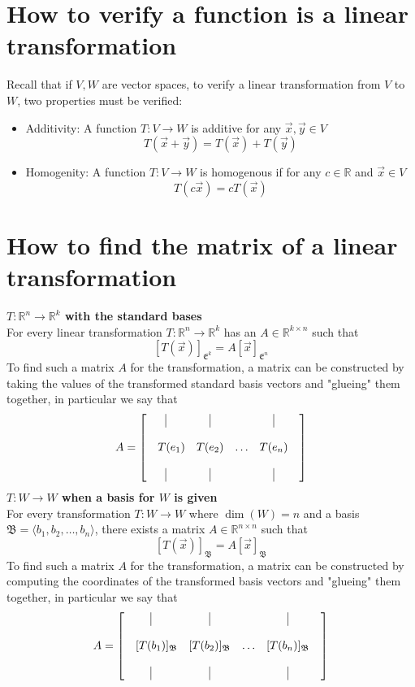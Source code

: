 \documentclass{report}
\begin{document}
\section{How to verify a function is a linear transformation}
Recall that if $V,W$ are vector spaces, to verify a linear transformation from $V$ to $W$, two properties must be verified:
\begin{itemize}
\item Additivity: A function $T:V\rightarrow W$ is additive for any $\vec{x},\vec{y}\in V$
$$
T(\vec{x}+\vec{y}) = T(\vec{x}) + T(\vec{y})
$$
\item Homogenity: A function $T:V \rightarrow W$ is homogenous if for any $c\in\mathbb{R}$ and $\vec{x}\in V$
$$
T(c\vec{x}) = cT(\vec{x})
$$
\end{itemize}
\pagebreak
{}
\section{How to find the matrix of a linear transformation}
\textbf{$T:\mathbb{R}^n\rightarrow\mathbb{R}^k$ with the standard bases} \\
For every linear transformation $T:\mathbb{R}^n\rightarrow\mathbb{R}^k$ has an $A\in\mathbb{R}^{k\times n}$ such that
$$
[T(\vec{x})]_{\mathfrak{E}^k} = A[\vec{x}]_{\mathfrak{E}^n}
$$
To find such a matrix $A$ for the transformation,  a matrix can be constructed by taking the values of the transformed standard basis vectors and "glueing" them together,  in particular we say that
$$
A = \begin{bmatrix}
\vline&\vline&&\vline\\
&&&&\\
\quad T(e_1)&T(e_2)&\ldots&T(e_n)\\
&&&\\
\vline&\vline&&\vline
\end{bmatrix}
$$
\textbf{$T:W \rightarrow W$ when a basis for $W$ is given} \\
For every transformation $T:W \rightarrow W$ where $\dim(W)=n$ and a basis $\mathfrak{B}=\langle b_1, b_2, \ldots, b_n\rangle$,  there exists a matrix $A\in\mathbb{R}^{n\times n}$ such that
$$
[T(\vec{x})]_\mathfrak{B} = A[\vec{x}]_\mathfrak{B}
$$
To find such a matrix $A$ for the transformation,  a matrix can be constructed by computing the coordinates of the transformed basis vectors and "glueing" them together,  in particular we say that
$$
A = \begin{bmatrix}
\vline&\vline&&\vline\\
&&&&\\
\quad[T(b_1)]_\mathfrak{B}&[T(b_2)]_\mathfrak{B}&\ldots&[T(b_n)]_\mathfrak{B}\\
&&&\\
\vline&\vline&&\vline
\end{bmatrix}
$$
\end{document}
